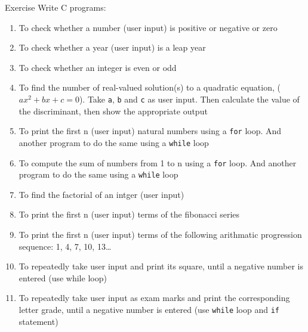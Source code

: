 \documentclass[12pt, aspectratio=169]{beamer}
\begin{document}
    \begin{frame}[allowframebreaks=0.75]{Exercise}
        Write C programs:
        \begin{enumerate}
            \item To check whether a number (user input) is positive or negative or zero
            \item To check whether a year (user input) is a leap year
            \item To check whether an integer is even or odd
            \item To find the number of real-valued solution(s) to a quadratic equation, (\(ax^2+bx+c=0\)). Take \texttt{a}, \texttt{b} and \texttt{c} as user input. Then calculate the value of the discriminant, then show the appropriate output
            \item To print the first n (user input) natural numbers using a \texttt{for} loop. And another program to do the same using a \texttt{while} loop
            \item To compute the sum of numbers from 1 to n using a \texttt{for} loop. And another program to do the same using a \texttt{while} loop
            \item To find the factorial of an intger (user input)
            \item To print the first n (user input) terms of the fibonacci series
            \item To print the first n (user input) terms of the following arithmatic progression sequence: 1, 4, 7, 10, 13\dots
            \item To repeatedly take user input and print its square, until a negative number is entered (use while loop)
            \item To repeatedly take user input as exam marks and print the corresponding letter grade, until a negative number is entered (use \texttt{while} loop and \texttt{if} statement)
        \end{enumerate}
    \end{frame}
\end{document}

